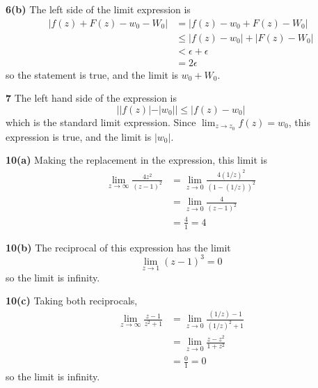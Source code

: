 \documentclass{article}
\begin{document}
\textbf{6(b)}
The left side of the limit expression is
\begin{align*}
	|f(z) + F(z) - w_0 - W_0| &= |f(z) - w_0 + F(z) - W_0| \\
	&\le |f(z) - w_0| + |F(z) - W_0| \\
	&< \epsilon + \epsilon \\
	&= 2\epsilon
\end{align*}
so the statement is true, and the limit is $w_0 + W_0$.

\textbf{7}
The left hand side of the expression is
\[
	| |f(z)| - |w_0|| \le |f(z) - w_0|
\]
which is the standard limit expression. Since $\lim_{z \to z_0} f(z) = w_0$, this expression is true, and the limit is $|w_0|$.

\textbf{10(a)}
Making the replacement in the expression, this limit is
\begin{align*}
	\lim_{z \to \infty} \frac{4z^2}{(z - 1)^2} 
	&= \lim_{z \to 0} \frac{4(1/z)^2}{(1 - (1/z))^2} \\
	&= \lim_{z \to 0} \frac{4}{(z - 1)^2} \\
	&= \frac{4}{1} = 4
\end{align*}

\textbf{10(b)}
The reciprocal of this expression has the limit
\[
	\lim_{z \to 1} (z - 1)^3 = 0
\]
so the limit is infinity.

\textbf{10(c)}
Taking both reciprocals,
\begin{align*}
	\lim_{z \to \infty} \frac{z - 1}{z^2 + 1}
	&= \lim_{z \to 0} \frac{(1/z) - 1}{(1/z)^2 + 1} \\
	&= \lim_{z \to 0} \frac{z - z^2}{1 + z^2} \\
	&= \frac{0}{1} = 0
\end{align*}
so the limit is infinity.
\end{document}
